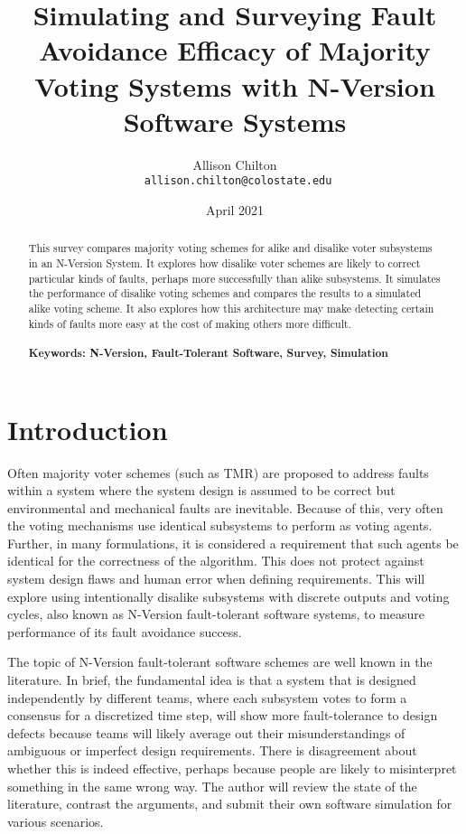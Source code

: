 \documentclass[article]{IEEEtran}
\begin{document}
\title{Simulating and Surveying Fault Avoidance Efficacy of Majority Voting Systems with N-Version Software Systems}
\author{Allison Chilton\\\texttt{ allison.chilton@colostate.edu}}
\date{April 2021}

\maketitle


\begin{abstract}
This survey compares majority voting schemes for alike and disalike voter subsystems in an N-Version System. It explores how disalike voter schemes are likely to correct particular kinds of faults, perhaps more successfully than alike subsystems. It simulates the performance of disalike voting schemes and compares the results to a simulated alike voting scheme. It also explores how this architecture may make detecting certain kinds of faults more easy at the cost of making others more difficult.
\hfill\\\\
\textbf{Keywords: N-Version, Fault-Tolerant Software, Survey, Simulation}
\end{abstract}


\section{Introduction}
\par
Often majority voter schemes (such as TMR) are proposed to address faults within a system where the system design is assumed to be correct but environmental and mechanical faults are inevitable. Because of this, very often the voting mechanisms use identical subsystems to perform as voting agents. Further, in many formulations, it is considered a requirement that such agents be identical for the correctness of the algorithm. This does not protect against system design flaws and human error when defining requirements. This will explore using intentionally disalike subsystems with discrete outputs and voting cycles, also known as N-Version fault-tolerant software systems, to measure performance of its fault avoidance success. 
\par
The topic of N-Version fault-tolerant software schemes are well known in the literature. In brief, the fundamental idea is that a system that is designed independently by different teams, where each subsystem votes to form a consensus for a discretized time step, will show more fault-tolerance to design defects because teams will likely average out their misunderstandings of ambiguous or imperfect design requirements. There is disagreement about whether this is indeed effective, perhaps because people are likely to misinterpret something in the same wrong way. The author will review the state of the literature, contrast the arguments, and submit their own software simulation for various scenarios. 
\end{document}
